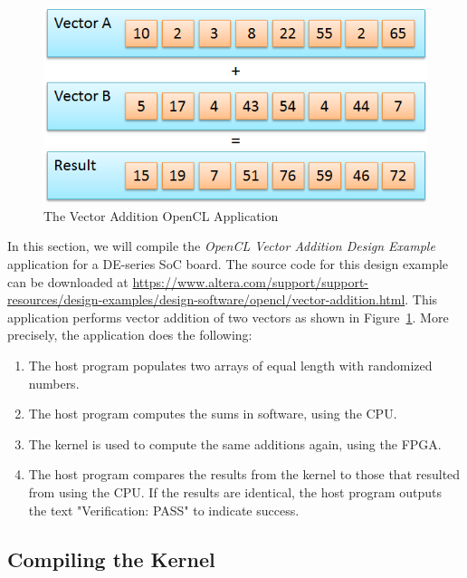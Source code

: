 \documentclass[11pt, twoside, pdftex]{article}
\begin{document}
\begin{figure} [H]
\begin{center}
\includegraphics[scale = 0.7]{figures/vectoradd.png}
\end{center}
\caption{The Vector Addition OpenCL Application}
\label{fig:vector_add}
\end{figure}

In this section, we will compile the \textit{OpenCL Vector Addition Design Example} application for a DE-series SoC board. The source code for this design example can be downloaded at \href{https://www.altera.com/support/support-resources/design-examples/design-software/opencl/vector-addition.html}{https://www.altera.com/support/support-resources/design-examples/design-software/opencl/vector-addition.html}. This application performs vector addition of two vectors as shown in Figure~\ref{fig:vector_add}. More precisely, the application does the following:
\begin{enumerate}
\item The host program populates two arrays of equal length with randomized numbers. 
\item The host program computes the sums in software, using the CPU.
\item The kernel is used to compute the same additions again, using the FPGA.
\item The host program compares the results from the kernel to those that resulted from using the CPU. If the results are identical, the host program outputs the text "Verification: PASS" to indicate success. 
\end{enumerate}

\subsection{Compiling the Kernel}
\end{document}
